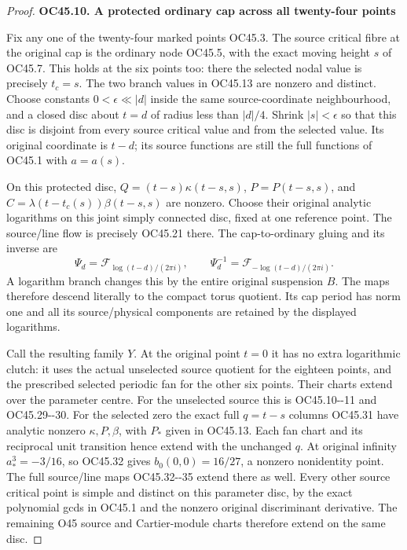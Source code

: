 \begin{proof}
\par

\medskip\noindent\textbf{OC45.10. A protected ordinary cap across all twenty-four points}

\par\nobreak

Fix any one of the twenty-four marked points OC45.3. The
source critical fibre at the original cap is the ordinary
node OC45.5, with the exact moving height \(s\) of OC45.7.
This holds at the six points too: there the selected nodal
value is precisely \(t_c=s\). The two branch values in
OC45.13 are nonzero and distinct. Choose constants
\(0<\epsilon\ll |d|\) inside the same source-coordinate
neighbourhood, and a closed disc about \(t=d\) of radius
less than \(|d|/4\). Shrink \(|s|<\epsilon\) so that this
disc is disjoint from every source critical value and from
the selected value. Its original coordinate is \(t-d\);
its source functions are still the full functions of
OC45.1 with \(a=a(s)\).

On this protected disc, \(Q=(t-s)\kappa(t-s,s)\),
\(P=P(t-s,s)\), and \(C=\lambda(t-t_c(s))\beta(t-s,s)\)
are nonzero. Choose their original analytic logarithms
on this joint simply connected disc, fixed at one reference
point. The source/line flow is precisely OC45.21 there.
The cap-to-ordinary gluing and its inverse are
\[
 \Psi_d=\mathcal F_{\log(t-d)/(2\pi i)},\qquad
 \Psi_d^{-1}=\mathcal F_{-\log(t-d)/(2\pi i)}.
 \tag{OC45.65}
\]
A logarithm branch changes this by the entire original
suspension \(B\). The maps therefore descend literally
to the compact torus quotient. Its cap period has norm
one and all its source/physical components are retained
by the displayed logarithms.

Call the resulting family \(Y\). At the original point
\(t=0\) it has no extra logarithmic clutch: it uses the
actual unselected source quotient for the eighteen points,
and the prescribed selected periodic fan for the other
six points. Their charts extend over the parameter centre.
For the unselected source this is OC45.10-\/-11 and
OC45.29-\/-30. For the selected zero the exact full
\(q=t-s\) columns OC45.31 have analytic nonzero
\(\kappa,P,\beta\), with \(P_*\) given in OC45.13.
Each fan chart and its reciprocal unit transition hence
extend with the unchanged \(q\). At original infinity
\(a_*^3=-3/16\), so OC45.32 gives
\(b_0(0,0)=16/27\), a nonzero nonidentity point. The full
source/line maps OC45.32-\/-35 extend there as well.
Every other source critical point is simple and distinct
on this parameter disc, by the exact polynomial gcds
in OC45.1 and the nonzero original discriminant derivative.
The remaining O45 source and Cartier-module charts
therefore extend on the same disc.


\end{proof}
